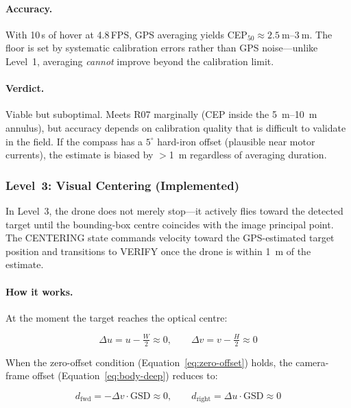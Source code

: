 \paragraph{Accuracy.}  With 10\,s of hover at 4.8\,FPS, GPS averaging yields CEP$_{50} \approx \SIrange{2.5}{3}{\metre}$.  The floor is set by systematic calibration errors rather than GPS noise---unlike Level~1, averaging \emph{cannot} improve beyond the calibration limit.

\paragraph{Verdict.}  Viable but suboptimal.  Meets R07 marginally (CEP inside the \SIrange{5}{10}{\metre} annulus), but accuracy depends on calibration quality that is difficult to validate in the field.  If the compass has a $5^{\circ}$ hard-iron offset (plausible near motor currents), the estimate is biased by $>$\SI{1}{\metre} regardless of averaging duration.

\subsubsection{Level~3: Visual Centering (Implemented)}\label{sec:level-3-centering}

In Level~3, the drone does not merely stop---it actively flies toward the detected target until the bounding-box centre coincides with the image principal point.  The CENTERING state commands velocity toward the GPS-estimated target position and transitions to VERIFY once the drone is within \SI{1}{\metre} of the estimate.

\paragraph{How it works.}  At the moment the target reaches the optical centre:

\begin{equation}\label{eq:zero-offset}
  \Delta u = u - \tfrac{W}{2} \approx 0, \qquad \Delta v = v - \tfrac{H}{2} \approx 0
\end{equation}

\noindent When the zero-offset condition (Equation~\ref{eq:zero-offset}) holds, the camera-frame offset (Equation~\ref{eq:body-deep}) reduces to:

\begin{equation}\label{eq:zero-projection}
  d_\mathrm{fwd} = -\Delta v \cdot \mathrm{GSD} \approx 0, \qquad d_\mathrm{right} = \Delta u \cdot \mathrm{GSD} \approx 0
\end{equation}

